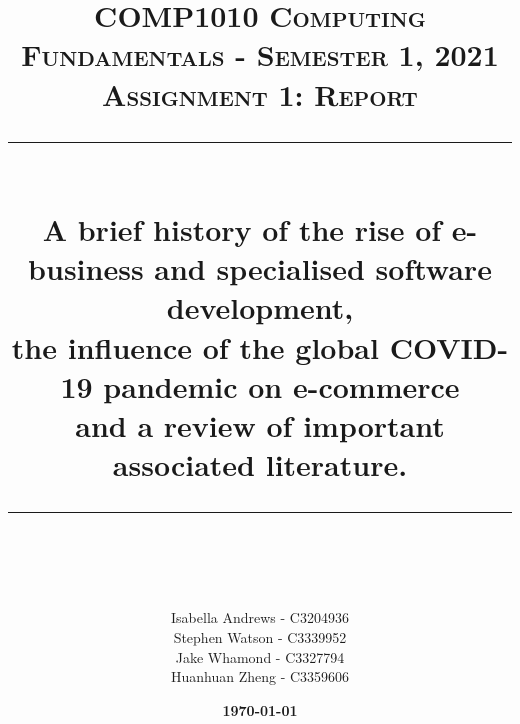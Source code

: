 \documentclass[12pt]{article}
\begin{document}

\title{\Large \textsc{COMP1010 Computing Fundamentals - Semester 1, 2021 \\ Assignment 1: Report} \\ [2.0cm]
\hrule{} \\ [1.0cm]
\large \bfseries A brief history of the rise of e-business and specialised software development, \\ the influence of the global COVID-19 pandemic on e-commerce \\ and a review of important associated literature. \\ [1.0cm]
\hrule{} \\ [2.0cm]}

\author{
    Isabella Andrews - C3204936 \\
    Stephen Watson - C3339952 \\
    Jake Whamond - C3327794 \\
    Huanhuan Zheng - C3359606 \\ [2.0cm]}

\date{\bfseries \today}

\maketitle

\newpage
{} 
\newpage
\end{document}
